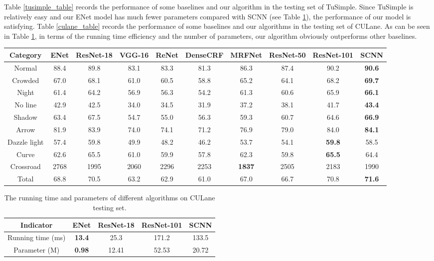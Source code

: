 \documentclass[draftcls]{IEEEtran}
\begin{document}
Table \ref{tusimple_table} records the performance of some baselines and our algorithm in the testing set of TuSimple. Since TuSimple is relatively easy and our ENet model has much fewer parameters compared with SCNN (see Table \ref{culane_model}), the performance of our model is satisfying. Table \ref{culane_table} records the performance of some baselines and our algorithms in the testing set of CULane. As can be seen in Table \ref{culane_model}, in terms of the running time efficiency and the number of parameters, our algorithm obviously outperforms other baselines. 

\begin{table*}[!t]
\caption{Performance (-measure) of different algorithms on CULane testing set.  indicates the results are copied from~\cite{pan2017spatial}. For crossroad, only FP is shown.}
\label{culane_table}
\centering
\begin{tabular}{c|c|c|c|c|c|c|c|c|c}
\hline
Category & \textbf{ENet} & ResNet-18 & VGG-16 & ReNet & DenseCRF & MRFNet & ResNet-50 & ResNet-101 & SCNN \\
\hline \hline
Normal & 88.4 & 89.8 & 83.1 & 83.3 & 81.3 & 86.3 & 87.4 & 90.2 & \textbf{90.6} \\
\hline
Crowded & 67.0 & 68.1 & 61.0 & 60.5 & 58.8 & 65.2 & 64.1 & 68.2 & \textbf{69.7} \\
\hline
Night & 61.4 & 64.2 & 56.9 & 56.3 & 54.2 & 61.3 & 60.6 & 65.9 & \textbf{66.1} \\
\hline
No line & 42.9 & 42.5 & 34.0 & 34.5 & 31.9 & 37.2 & 38.1 & 41.7 & \textbf{43.4} \\
\hline
Shadow & 63.4 & 67.5 & 54.7 & 55.0 & 56.3 & 59.3 & 60.7 & 64.6 & \textbf{66.9} \\
\hline
Arrow & 81.9 & 83.9 & 74.0 & 74.1 & 71.2 & 76.9 & 79.0 & 84.0 & \textbf{84.1} \\
\hline
Dazzle light & 57.4 & 59.8 & 49.9 & 48.2 & 46.2 & 53.7 & 54.1 & \textbf{59.8} & 58.5 \\
\hline
Curve & 62.6 & 65.5 & 61.0 & 59.9 & 57.8 & 62.3 & 59.8 & \textbf{65.5} & 64.4 \\
\hline
Crossroad & 2768 & 1995 & 2060 & 2296 & 2253 & \textbf{1837} & 2505 & 2183 & 1990 \\
\hline
Total & 68.8 & 70.5 & 63.2 & 62.9 & 61.0 & 67.0 & 66.7 & 70.8 & \textbf{71.6} \\
\hline
\end{tabular}
\end{table*}


\begin{table}[!t]
\caption{The running time and parameters of different algorithms on CULane testing set.}
\label{culane_model}
\centering
\begin{tabular}{c|c|c|c|c}
\hline
Indicator & \textbf{ENet} & ResNet-18 & ResNet-101 & SCNN \\
\hline \hline
Running time (ms) & \textbf{13.4} & 25.3 & 171.2 & 133.5  \\
\hline
Parameter (M) & \textbf{0.98} & 12.41 & 52.53 & 20.72  \\
\hline
\end{tabular}
\end{table} 
\end{document}
